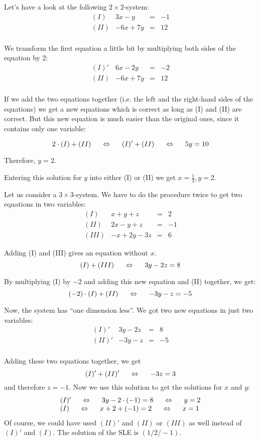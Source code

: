 \begin{example}
Let's have a look at the following $2\times 2$-system:
\[
\begin{array}{lrcl}
(I) &3x-y &=&-1\\
(II) &-6x+7y&=&12\\
\end{array}
\]

We transform the first equation a little bit by multiplying both sides of the equation by 2:
\[
\begin{array}{lrcl}
(I)'&6x- 2y &=&-2\\
(II)&-6x+7y&=&12\\
\end{array}
\]
 
If we add the two equations together (i.e. the left and the right-hand sides of the equations) we get a new equations which is correct as long as (I) and (II) are correct. But this new equation is much easier than the original ones, since it contains only one variable:

\[
2\cdot (I)+(II) \hspace{5mm}\Leftrightarrow\hspace{5mm} (I)'+(II) \hspace{5mm}\Leftrightarrow\hspace{5mm} 5y=10
\]

Therefore, $y=2$.

Entering this solution for $y$ into either (I) or (II) we get $x=\frac{1}{3}, y=2$.
\end{example}
\vsp


\begin{example} 
Let us consider a $3\times 3$-system. We have to do the procedure twice to get two equations in two variables:
\[
\begin{array}{lrcl}
(I)&x+y+z&=&2\\
(II)&2x-y+z&=&-1\\
(III)&-x+2y-3z&=&6
\end{array}
\]
 
Adding (I) and (III) gives an equation without $x$. 
\[
(I)+(III) \hspace{5mm}\Leftrightarrow\hspace{5mm} 3y-2z=8
\]

By multiplying (I) by $-2$ and adding this new equation and (II) together, we get:
\[
(-2)\cdot (I)+(II) \hspace{5mm}\Leftrightarrow\hspace{5mm} -3y-z=-5
\]

Now, the system has ``one dimension less''. We got two new equations in just two variables:
\[
\begin{array}{lrcl}
(I)'&3y-2z&=&8\\
(II)'&-3y-z&=&-5\\
\end{array}
\]	 

Adding these two equations together, we get
\[
(I)'+(II)' \hspace{5mm}\Leftrightarrow\hspace{5mm} -3z=3
\]
and therefore $z=-1$. Now we use this solution to get the solutions for $x$ and $y$:
\[
\begin{array}{l}
(I)' \hspace{5mm}\Leftrightarrow\hspace{5mm} 3y-2\cdot (-1)=8 \hspace{5mm}\Leftrightarrow\hspace{5mm} y=2\\
(I)  \hspace{5mm}\Leftrightarrow\hspace{5mm} x+2+(-1)=2 \hspace{5mm}\Leftrightarrow\hspace{5mm} x=1\\
\end{array}
\]
Of course, we could have used $(II)'$ and $(II)$ or $(III)$ as well instead of $(I)'$ and $(I)$. The solution of the SLE is $(1/2/-1)$.
\end{example}


